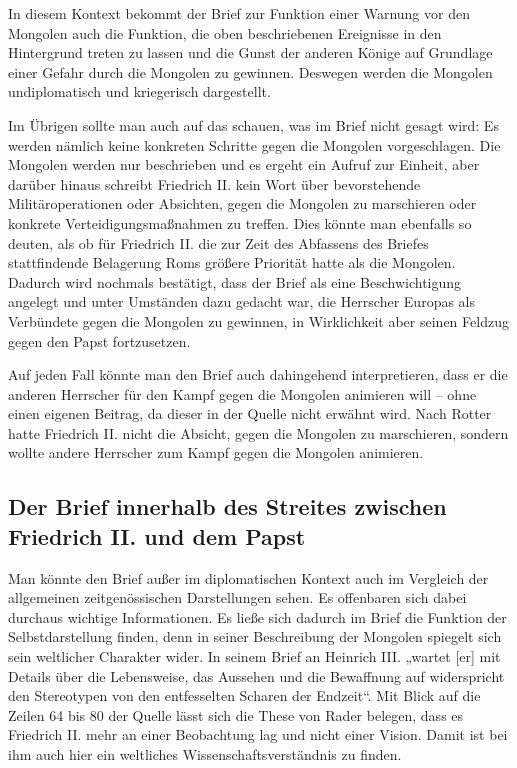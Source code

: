 \documentclass{../../sem_paper}
\begin{document}
In diesem Kontext bekommt der Brief zur Funktion einer Warnung vor den
Mongolen auch die Funktion, die oben beschriebenen Ereignisse in den Hintergrund
treten zu lassen und die Gunst der anderen Könige auf Grundlage einer Gefahr durch die
Mongolen zu gewinnen. Deswegen werden die Mongolen undiplomatisch und
kriegerisch dargestellt.

Im Übrigen sollte man auch auf das schauen, was im Brief nicht gesagt wird: Es
werden nämlich keine konkreten Schritte gegen die Mongolen vorgeschlagen. Die
Mongolen werden nur beschrieben und es ergeht ein Aufruf zur Einheit, aber darüber
hinaus schreibt Friedrich II. kein Wort über bevorstehende Militäroperationen oder
Absichten, gegen die Mongolen zu marschieren oder konkrete Verteidigungsmaßnahmen
zu treffen. Dies könnte man ebenfalls so deuten, als ob für Friedrich II. die zur Zeit des
Abfassens des Briefes stattfindende Belagerung Roms größere Priorität hatte als die
Mongolen. Dadurch wird nochmals bestätigt, dass der Brief als eine Beschwichtigung
angelegt und unter Umständen dazu gedacht war, die Herrscher Europas als Verbündete
gegen die Mongolen zu gewinnen, in Wirklichkeit aber seinen Feldzug gegen den Papst
fortzusetzen.

Auf jeden Fall könnte man den Brief auch dahingehend interpretieren, dass er
 die anderen Herrscher für den Kampf gegen die Mongolen animieren will –
ohne einen eigenen Beitrag, da dieser in der Quelle nicht erwähnt wird. Nach Rotter\autocite[138]{rotter2000}
 hatte Friedrich II. nicht die Absicht, gegen die Mongolen zu marschieren,
sondern wollte andere Herrscher zum Kampf gegen die Mongolen animieren.

\subsection{Der Brief innerhalb des Streites zwischen Friedrich II. und dem Papst}
Man könnte den Brief außer im diplomatischen Kontext auch im Vergleich der
allgemeinen zeitgenössischen Darstellungen sehen. Es offenbaren sich dabei durchaus
wichtige Informationen. Es ließe sich dadurch im Brief die Funktion der
Selbstdarstellung finden, denn in seiner Beschreibung der Mongolen spiegelt sich sein
weltlicher Charakter wider. In seinem Brief an Heinrich III. „wartet [er] mit Details über
die Lebensweise, das Aussehen und die Bewaffnung auf widerspricht den Stereotypen
von den entfesselten Scharen der Endzeit“\autocite[470]{rader2010}. Mit Blick auf die Zeilen 64 bis 80 der
Quelle lässt sich die These von Rader\autocite[470]{rader2010} belegen, dass es Friedrich II. mehr an
einer Beobachtung lag und nicht einer Vision. Damit ist bei ihm auch hier ein weltliches
Wissenschaftsverständnis zu finden.
\end{document}
